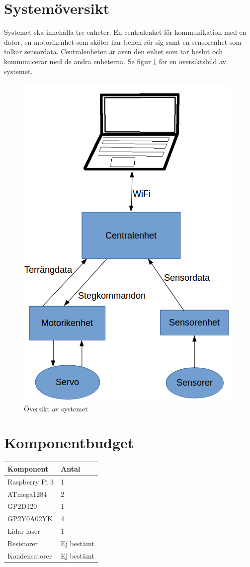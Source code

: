 \documentclass[a4paper,titlepage,12pt]{article}
\begin{document}
	\section{Systemöversikt}
	Systemet ska innehålla tre enheter. En centralenhet för kommunikation med en
	dator, en motorikenhet som sköter hur benen rör sig samt en sensorenhet som
	tolkar sensordata. Centralenheten är även den enhet som tar beslut och
	kommunicerar med de andra enheterna. Se figur \ref{fig:overview} för en översiktsbild av
	systemet.
	\begin{figure}[h]
		\centering
		\includegraphics[width=0.5\linewidth]{../images/overview.png}
		\caption{Översikt av systemet\label{fig:overview}}
	\end{figure}
	
	\section{Komponentbudget}
	\begin{longtable}[c]{l l}
		\textbf{Komponent} & \textbf{Antal} \\ \midrule
		Raspberry Pi 3 & 1 \\
		ATmega1284 & 2 \\
		GP2D120 & 1 \\
		GP2Y0A02YK & 4 \\
		Lidar laser & 1 \\
		Resistorer & Ej bestämt \\
		Kondensatorer & Ej bestämt \\
		
	\end{longtable}
\end{document}
